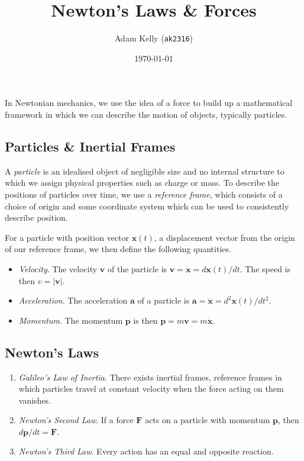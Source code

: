 \documentclass{scrartcl}
\title{Newton's Laws \& Forces}
\author{Adam Kelly (\texttt{ak2316})}
\date{\today}
\newcommand{\vv}[1]{\boldsymbol{\mathbf{#1}}}
\theoremstyle{definition}
\begin{document}
\maketitle  

In Newtonian mechanics, we use the idea of a force to build up a mathematical framework in which we can describe the motion of objects, typically particles.

\subsection*{Particles \& Inertial Frames}

A \emph{particle} is an idealised object of negligible size and no internal structure to which we assign physical properties such as charge or mass.
To describe the positions of particles over time, we use a \emph{reference frame}, which consists of a choice of origin and some coordinate system which can be used to consistently describe position.

For a particle with position vector $\vv x(t)$, a displacement vector from the origin of our reference frame, we then define the following quantities.
\begin{itemize}
	\item \emph{Velocity}. The velocity $\vv v$ of the particle is $\vv v = \dot{\vv x} = d \vv x(t) / dt$. The speed is then $v = |\vv v|$.
	\item \emph{Acceleration}. The acceleration $\vv a$ of a particle is $\vv a = \ddot{\vv x} = d^2 \vv x(t)/dt^2$.
	\item \emph{Momentum}. The momentum $\vv p$ is then $\vv p = m \vv v = m \dot{\vv x}$.
\end{itemize}


\subsection*{Newton's Laws}

\begin{enumerate}
	\item \emph{Galileo's Law of Inertia}. There exists inertial frames, reference frames in which particles travel at constant velocity when the force acting on them vanishes.
	\item \emph{Newton's Second Law}. If a force $\vv F$ acts on a particle with momentum $\vv p$, then $d\vv p/dt = \vv F$.
	\item \emph{Newton's Third Law}. Every action has an equal and opposite reaction.
\end{enumerate}
\end{document}
